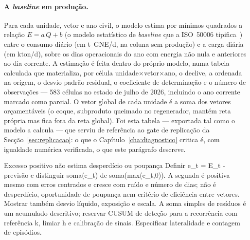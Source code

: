 \paragraph{A \emph{baseline} em produção.} Para cada unidade, vetor e ano
civil, o modelo estima por mínimos quadrados a relação
$E = a\,Q + b$ (o modelo estatístico de \emph{baseline} que a ISO~50006
tipifica~\cite{ISO50006_2014}) entre o consumo diário (em t~GNE/d, na coluna sem
produção) e a carga diária (em kton/d), sobre os dias operacionais do ano
com energia não nula e anteriores ao dia corrente. A estimação é feita
dentro do próprio modelo, numa tabela calculada que materializa, por
célula unidade$\times$vetor$\times$ano, o declive, a ordenada na origem,
o desvio-padrão residual, o coeficiente de determinação e o número de
observações --- 583 células no estado de julho de 2026, incluindo o ano
corrente marcado como parcial. O vetor global de cada unidade é a soma
dos vetores orçamentáveis (o coque, subproduto queimado no regenerador,
mantém reta própria mas fica fora da reta global). Foi esta tabela ---
exportada tal como o modelo a calcula --- que serviu de referência ao gate
de replicação da Secção~\ref{sec:replicacao}: o que o
Capítulo~\ref{cha:diagnostico} critica é, com igualdade numérica
verificada, o que este parágrafo descreve.

{Excesso positivo não estima desperdício ou poupança}
{Definir e\_t = E\_t - previsão e distinguir soma(e\_t) de soma(max(e\_t,0)).
A segunda é positiva mesmo com erros centrados e cresce com ruído e
número de dias; não é desperdício, oportunidade de poupança nem critério
de eficiência entre vetores. Mostrar também desvio líquido, exposição
e escala. A soma simples de resíduos é um acumulado descritivo; reservar
CUSUM de deteção para a recorrência com referência k, limiar h e
calibração de sinais. Especificar lateralidade e contagem de episódios.}%
